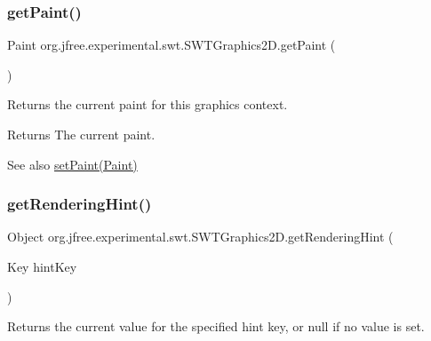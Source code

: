 \subsubsection{\texorpdfstring{get\+Paint()}{getPaint()}}
{\footnotesize\ttfamily Paint org.\+jfree.\+experimental.\+swt.\+S\+W\+T\+Graphics2\+D.\+get\+Paint (\begin{DoxyParamCaption}{ }\end{DoxyParamCaption})}

Returns the current paint for this graphics context.

\begin{DoxyReturn}{Returns}
The current paint.
\end{DoxyReturn}
\begin{DoxySeeAlso}{See also}
\mbox{\hyperlink{classorg_1_1jfree_1_1experimental_1_1swt_1_1_s_w_t_graphics2_d_a919af710ac35847e41844dad43ed02ec}{set\+Paint(\+Paint)}} 
\end{DoxySeeAlso}
\mbox{\label{classorg_1_1jfree_1_1experimental_1_1swt_1_1_s_w_t_graphics2_d_a9dadf87bbe1bd875799c1764834fade2}} 
\subsubsection{\texorpdfstring{get\+Rendering\+Hint()}{getRenderingHint()}}
{\footnotesize\ttfamily Object org.\+jfree.\+experimental.\+swt.\+S\+W\+T\+Graphics2\+D.\+get\+Rendering\+Hint (\begin{DoxyParamCaption}\item[{Key}]{hint\+Key }\end{DoxyParamCaption})}

Returns the current value for the specified hint key, or {\ttfamily null} if no value is set.


